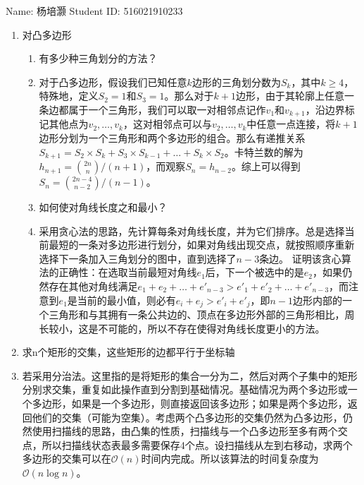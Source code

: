 \documentclass[12pt,a4paper]{article}
\makeatletter
\newtheorem*{solution}{Solution}
\theoremstyle{definition}
\renewenvironment{solution}[1][Solution] {\par\pushQED{\qed}\normalfont\topsep6\p@\@plus6\p@\relax\trivlist\item[\hskip\labelsep\bfseries#1\@addpunct{.}]\ignorespaces}{\popQED\endtrivlist\@endpefalse} \makeatother
\makeatother
\begin{document}
\noindent

\noindent{}
\begin{center}

\footnotesize{\color{black} Name: 杨培灏  \quad Student ID: 516021910233}
\end{center}

\begin{enumerate}

\item {
	对凸多边形
	\begin{enumerate}
		\item 有多少种三角划分的方法？
		\begin{solution}
			对于凸多边形，假设我们已知任意$k$边形的三角划分数为$S_k$，其中$k\ge4$，特殊地，定义$S_2=1$和$S_3=1$。那么对于$k+1$边形，由于其轮廓上任意一条边都属于一个三角形，我们可以取一对相邻点记作$v_1$和$v_{k+1}$，沿边界标记其他点为$v_2,\ldots,v_k$，这对相邻点可以与$v_2,\ldots,v_k$中任意一点连接，将$k+1$边形分划为一个三角形和两个多边形的组合。那么有递推关系$S_{k+1}=S_2\times S_k+S_3\times S_{k-1}+\ldots+S_k\times S_2$。卡特兰数的解为$h_{n+1}={2n\choose n}/(n+1)$，而观察$S_{n}=h_{n-2}$。综上可以得到$S_{n}={2n-4\choose n-2}/(n-1)$。		
		\end{solution}
		\item 如何使对角线长度之和最小？
		\begin{solution}
			采用贪心法的思路，先计算每条对角线长度，并为它们排序。总是选择当前最短的一条对多边形进行划分，如果对角线出现交点，就按照顺序重新选择下一条加入三角划分的图中，直到选择了$n-3$条边。
			证明该贪心算法的正确性：在选取当前最短对角线$e_1$后，下一个被选中的是$e_2$，如果仍然存在其他对角线满足$e_1+e_2+\ldots+e'_{n-3}>e'_1+e'_2+\ldots+e'_{n-3}$，而注意到$e_1$是当前的最小值，则必有$e_i+e_j>e'_i+e'_j$，即$n-1$边形内部的一个三角形和与其拥有一条公共边的、顶点在多边形外部的三角形相比，周长较小，这是不可能的，所以不存在使得对角线长度更小的方法。
		\end{solution}
	\end{enumerate}
} 
	
\item 求n个矩形的交集，这些矩形的边都平行于坐标轴
\begin{solution}
	若采用分治法。这里指的是将矩形的集合一分为二，然后对两个子集中的矩形分别求交集，重复如此操作直到分割到基础情况。基础情况为两个多边形或一个多边形，如果是一个多边形，则直接返回该多边形；如果是两个多边形，返回他们的交集（可能为空集）。考虑两个凸多边形的交集仍然为凸多边形，仍然使用扫描线的思路，由凸集的性质，扫描线与一个凸多边形至多有两个交点，所以扫描线状态表最多需要保存4个点。设扫描线从左到右移动，求两个多边形的交集可以在$\mathcal{O}(n)$时间内完成。所以该算法的时间复杂度为$\mathcal{O}(n\log n)$。
	

\end{solution}
\end{enumerate}
\end{document}
